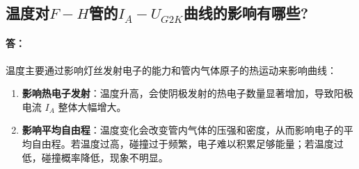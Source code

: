 \documentclass[]{../template/Report}%
\begin{document}
\begin{fullreportonly}
\subsection{温度对$F-H$管的$I_A-U_{G2K}$曲线的影响有哪些?}
\paragraph{答：}
温度主要通过影响灯丝发射电子的能力和管内气体原子的热运动来影响曲线：
\begin{enumerate}
    \item \textbf{影响热电子发射}：温度升高，会使阴极发射的热电子数量显著增加，导致阳极电流 $I_A$ 整体大幅增大。
    \item \textbf{影响平均自由程}：温度变化会改变管内气体的压强和密度，从而影响电子的平均自由程。若温度过高，碰撞过于频繁，电子难以积累足够能量；若温度过低，碰撞概率降低，现象不明显。
\end{enumerate}
\end{fullreportonly}
\insertnotes
\end{document}
